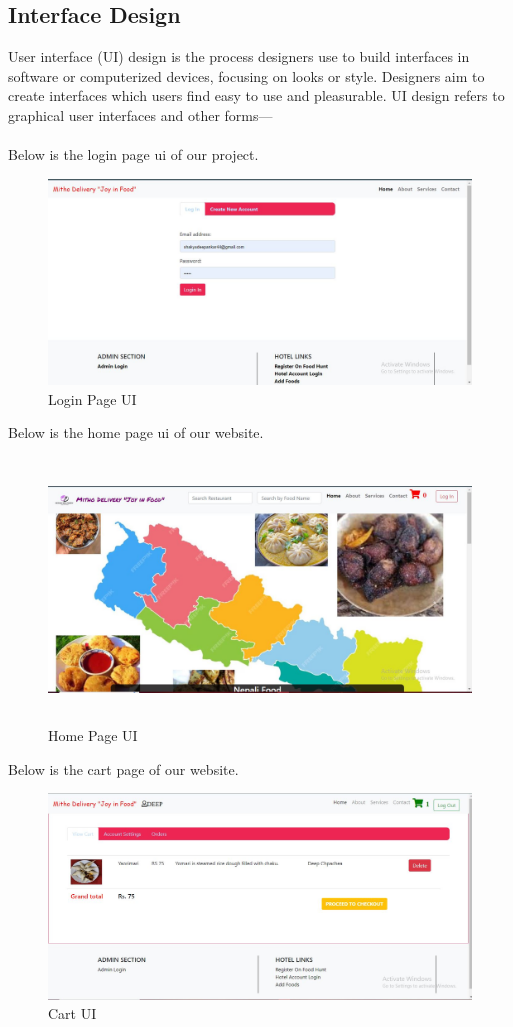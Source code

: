 \subsection{Interface Design}
User interface (UI) design is the process designers use to build interfaces in software or computerized devices, focusing on looks or style. Designers aim to create interfaces which users find easy to use and pleasurable. UI design refers to graphical user interfaces and other forms—\\\\
Below is the login page ui of our project.
\begin{figure}[h]
    \centering
    \includegraphics[scale=0.4]{img/Graphics/login ui.JPG}
    \caption{Login Page UI}
\end{figure}

Below is the home page ui of our website.
\begin{figure}[h]
    \centering
    \includegraphics[height=7cm]{img/Graphics/home ui.JPG}
    \caption{Home Page UI}
\end{figure}

\newpage
Below is the cart page of our website.
\begin{figure}[h]
    \centering
    \includegraphics[scale=0.4]{img/Graphics/cart ui.JPG}
    \caption{Cart UI}
\end{figure}


